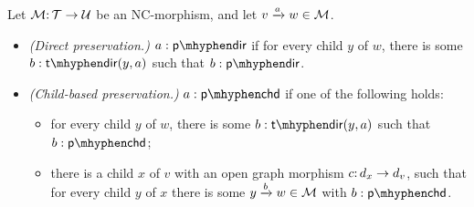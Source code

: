 \begin{definition}
Let ${\mathcal{M}}{:}\, {\mathcal{T}}\rightarrow{\mathcal{U}}$ be an NC-morphism, and let ${v}\xrightarrow{a}{w}\in{\mathcal{M}}$.
\begin{itemize}[topsep=\smallskipamount]
\item \emph{(Direct preservation.)} $a:\pdir$ if for every child $y$ of $w$, there is some $b:\tdir{y,a}$ such that $b:\pdir$.
\item \emph{(Child-based preservation.)} $a:\pchd$ if one of the following holds:
\begin{itemize}
\item for every child $y$ of $w$, there is some $b:\tdir{y,a}$ such that $b:\pchd$;
\item there is a child $x$ of $v$ with an open graph morphism $c{:}\, d_x\rightarrow d_v$, such that for every child $y$ of $x$ there is some ${y}\xrightarrow{b}{w}\in{\mathcal{M}}$ with $b:\pchd$.
\end{itemize}
\end{itemize}
\end{definition}

